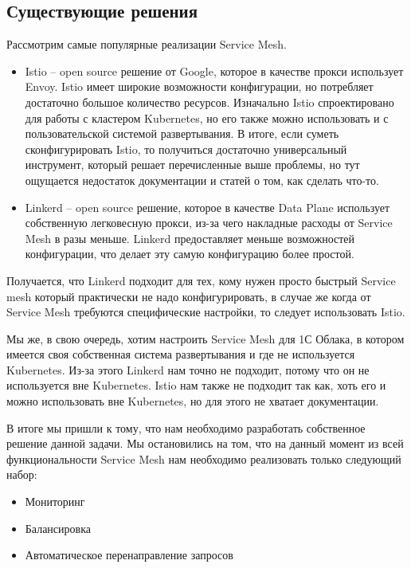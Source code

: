 \subsection{Существующие решения}

Рассмотрим самые популярные реализации Service Mesh.

\begin{itemize}
	\item Istio -- open source решение от Google, которое в качестве прокси использует Envoy. Istio имеет широкие возможности конфигурации, но потребляет достаточно большое количество ресурсов. Изначально Istio спроектировано для работы с кластером Kubernetes, но его также можно использовать и с пользовательской системой развертывания. В итоге, если суметь сконфигурировать Istio, то получиться достаточно универсальный инструмент, который решает перечисленные выше проблемы, но тут ощущается недостаток документации и статей о том, как сделать что-то.
	\item Linkerd -- open source решение, которое в качестве Data Plane использует собственную легковесную прокси, из-за чего накладные расходы от Service Mesh в разы меньше. Linkerd предоставляет меньше возможностей конфигурации, что делает эту самую конфигурацию более простой.
\end{itemize}

Получается, что Linkerd подходит для тех, кому нужен просто быстрый Service mesh который практически не надо конфигурировать, в случае же когда от Service Mesh требуются специфические настройки, то следует использовать Istio.

Мы же, в свою очередь, хотим настроить Service Mesh для 1С Облака, в котором имеется своя собственная система развертывания и где не используется Kubernetes. Из-за этого Linkerd нам точно не подходит, потому что он не используется вне Kubernetes. Istio нам также не подходит так как, хоть его и можно использовать вне Kubernetes, но для этого не хватает документации.

В итоге мы пришли к тому, что нам необходимо разработать собственное решение данной задачи. Мы остановились на том, что на данный момент из всей функциональности Service Mesh нам необходимо реализовать только следующий набор:
\begin{itemize}
	\item Мониторинг
	\item Балансировка
	\item Автоматическое перенаправление запросов 
\end{itemize}

